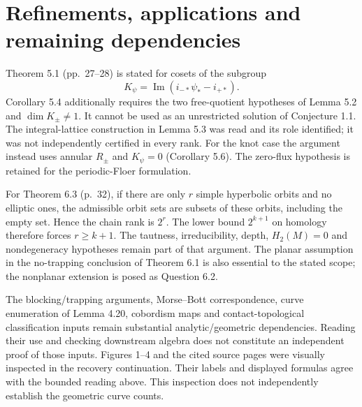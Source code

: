 \documentclass[10pt]{article}
\begin{document}
\section*{Refinements, applications and remaining dependencies}
Theorem 5.1 (pp. 27–28) is stated for cosets of the subgroup \[K_\psi=\operatorname{Im}(i_{-*}\psi_*-i_{+*}).\] Corollary 5.4 additionally requires the two free-quotient hypotheses of Lemma 5.2 and \(\dim K_\pm\ne1\). It cannot be used as an unrestricted solution of Conjecture 1.1. The integral-lattice construction in Lemma 5.3 was read and its role identified; it was not independently certified in every rank. For the knot case the argument instead uses annular \(R_\pm\) and \(K_\psi=0\) (Corollary 5.6). The zero-flux hypothesis is retained for the periodic-Floer formulation.\par
For Theorem 6.3 (p. 32), if there are only \(r\) simple hyperbolic orbits and no elliptic ones, the admissible orbit sets are subsets of these orbits, including the empty set. Hence the chain rank is \(2^r\). The lower bound \(2^{k+1}\) on homology therefore forces \(r\geq k+1\). The tautness, irreducibility, depth, \(H_2(M)=0\) and nondegeneracy hypotheses remain part of that argument. The planar assumption in the no-trapping conclusion of Theorem 6.1 is also essential to the stated scope; the nonplanar extension is posed as Question 6.2.\par
The blocking/trapping arguments, Morse–Bott correspondence, curve enumeration of Lemma 4.20, cobordism maps and contact-topological classification inputs remain substantial analytic/geometric dependencies. Reading their use and checking downstream algebra does not constitute an independent proof of those inputs. Figures 1–4 and the cited source pages were visually inspected in the recovery continuation. Their labels and displayed formulas agree with the bounded reading above. This inspection does not independently establish the geometric curve counts.\par
\end{document}
